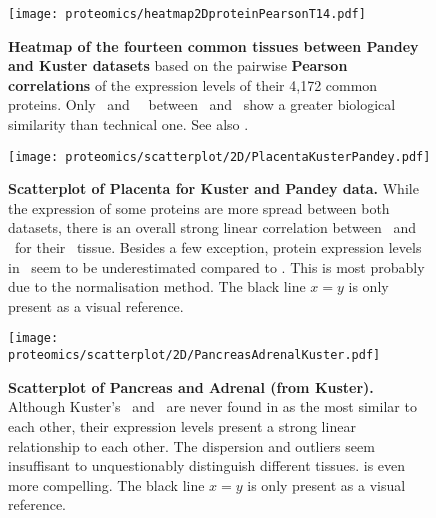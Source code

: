 \begin{figure}[!htpb]
    \texttt{[image: proteomics/heatmap2DproteinPearsonT14.pdf]}\centering
    \caption[Heatmap of the 14 common tissues between Pandey and Kuster
    datasets (Pearson correlation)]{\label{fig:prot2DheatmapPearson}\textbf{Heatmap
    of the fourteen common tissues between Pandey and Kuster datasets}
    based on the pairwise \textbf{Pearson correlations} of the expression levels of
    their 4,172 common proteins.
    Only \Placenta\ and \Adrenal\ \treps\ between \pandey\ and \kuster\ show
    a greater biological similarity than technical one.
    See also .}
\end{figure}

\begin{figure}[!htpb]
    \texttt{[image: proteomics/scatterplot/2D/PlacentaKusterPandey.pdf]}\centering
    \caption[Placenta: Kuster vs Pandey]{\label{fig:scat2DPlacentaKusterPandey}\textbf{%
    Scatterplot of Placenta for Kuster and Pandey data.}
    While the expression of some proteins are more spread between both datasets,
    there is an overall strong linear correlation between \pandey\ and \kuster\
    for their \placenta\ tissue.
    Besides a few exception,
    protein expression levels in \pandey\ seem to be underestimated compared to
    \kuster.
    This is most probably due to the normalisation method.
    {\small The black line $x=y$ is only present as a visual reference.}}
\end{figure}

\begin{figure}[!htpb]
    \texttt{[image: proteomics/scatterplot/2D/PancreasAdrenalKuster.pdf]}\centering
    \caption[Kuster: Pancreas vs Adrenal]{\label{fig:scat2DAdrenalPancreasKuster}\textbf{%
    Scatterplot of Pancreas and Adrenal (from Kuster).}
    Although Kuster's \Pancreas\ and \Adrenal\ are never found
    in 
    as the most similar to each other,
    their expression levels present a strong linear relationship to each other.
    The dispersion and outliers seem insuffisant
    to unquestionably distinguish different tissues.
     is even more compelling.
    {\small The black line $x=y$ is only present as a visual reference.}}
\end{figure}


